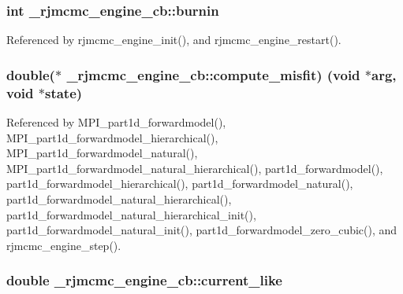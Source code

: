 \subsubsection[{\texorpdfstring{burnin}{burnin}}]{\setlength{\rightskip}{0pt plus 5cm}int \+\_\+rjmcmc\+\_\+engine\+\_\+cb\+::burnin}\hypertarget{struct__rjmcmc__engine__cb_acb9dcf3f03f16c4a1f6386ec0f1831d8}{}\label{struct__rjmcmc__engine__cb_acb9dcf3f03f16c4a1f6386ec0f1831d8}


Referenced by rjmcmc\+\_\+engine\+\_\+init(), and rjmcmc\+\_\+engine\+\_\+restart().

\subsubsection[{\texorpdfstring{compute\+\_\+misfit}{compute_misfit}}]{\setlength{\rightskip}{0pt plus 5cm}double($\ast$ \+\_\+rjmcmc\+\_\+engine\+\_\+cb\+::compute\+\_\+misfit) (void $\ast${\bf arg}, void $\ast$state)}\hypertarget{struct__rjmcmc__engine__cb_ad3f49710b8fbbe3214fb9bc834ab2d6a}{}\label{struct__rjmcmc__engine__cb_ad3f49710b8fbbe3214fb9bc834ab2d6a}


Referenced by M\+P\+I\+\_\+part1d\+\_\+forwardmodel(), M\+P\+I\+\_\+part1d\+\_\+forwardmodel\+\_\+hierarchical(), M\+P\+I\+\_\+part1d\+\_\+forwardmodel\+\_\+natural(), M\+P\+I\+\_\+part1d\+\_\+forwardmodel\+\_\+natural\+\_\+hierarchical(), part1d\+\_\+forwardmodel(), part1d\+\_\+forwardmodel\+\_\+hierarchical(), part1d\+\_\+forwardmodel\+\_\+natural(), part1d\+\_\+forwardmodel\+\_\+natural\+\_\+hierarchical(), part1d\+\_\+forwardmodel\+\_\+natural\+\_\+hierarchical\+\_\+init(), part1d\+\_\+forwardmodel\+\_\+natural\+\_\+init(), part1d\+\_\+forwardmodel\+\_\+zero\+\_\+cubic(), and rjmcmc\+\_\+engine\+\_\+step().

\subsubsection[{\texorpdfstring{current\+\_\+like}{current_like}}]{\setlength{\rightskip}{0pt plus 5cm}double \+\_\+rjmcmc\+\_\+engine\+\_\+cb\+::current\+\_\+like}\hypertarget{struct__rjmcmc__engine__cb_a78debea197d5739a1e1851764dc360d8}{}\label{struct__rjmcmc__engine__cb_a78debea197d5739a1e1851764dc360d8}


